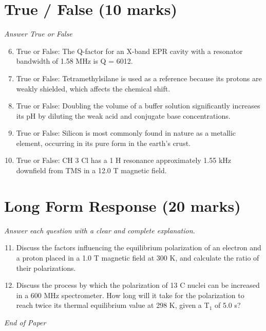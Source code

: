 \documentclass[12pt]{article}
\begin{document}
\section*{True / False (10 marks)}
\textit{Answer True or False}
\begin{enumerate}[label=\arabic*.]
\setcounter{enumi}{5}
\item True or False: The Q-factor for an X-band EPR cavity with a resonator bandwidth of 1.58 MHz is Q = 6012.
\item True or False: Tetramethylsilane is used as a reference because its protons are weakly shielded, which affects the chemical shift.
\item True or False: Doubling the volume of a buffer solution significantly increases its pH by diluting the weak acid and conjugate base concentrations.
\item True or False: Silicon is most commonly found in nature as a metallic element, occurring in its pure form in the earth's crust.
\item True or False: CH 3 Cl has a 1 H resonance approximately 1.55 kHz downfield from TMS in a 12.0 T magnetic field.
\end{enumerate}

\section*{Long Form Response (20 marks)}
\textit{Answer each question with a clear and complete explanation.}
\begin{enumerate}[label=\arabic*.]
\setcounter{enumi}{10}
\item Discuss the factors influencing the equilibrium polarization of an electron and a proton placed in a 1.0 T magnetic field at 300 K, and calculate the ratio of their polarizations.
\item Discuss the process by which the polarization of 13 C nuclei can be increased in a 600 MHz spectrometer. How long will it take for the polarization to reach twice its thermal equilibrium value at 298 K, given a T$_{1}$ of 5.0 s?
\end{enumerate}

\vfill
\noindent\textit{End of Paper}
\end{document}
